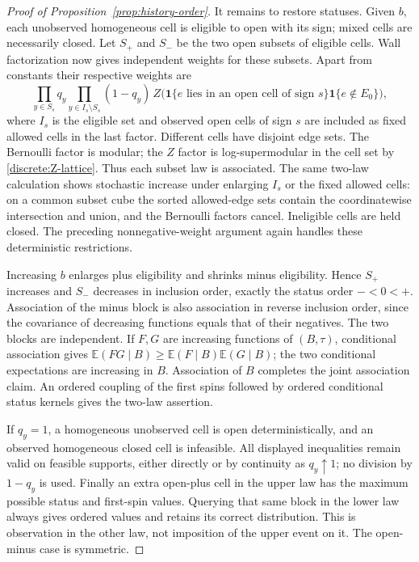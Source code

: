 \documentclass[11pt]{article}
\newcommand{\E}{\mathbb E}
\newcommand{\ind}{\mathbf 1}
\theoremstyle{definition}
\theoremstyle{remark}
\numberwithin{equation}{section}
\begin{document}
\begin{proof}[Proof of Proposition~\ref{prop:history-order}]
It remains to restore statuses. Given $b$, each unobserved homogeneous
cell is eligible to open with its sign; mixed cells are necessarily closed.
Let $S_+$ and $S_-$ be the two open subsets of eligible cells. Wall
factorization now gives independent weights for these subsets. Apart from
constants their respective weights are
\begin{equation}\label{discrete:subset-weight}
 \prod_{y\in S_s}q_y
 \prod_{y\in I_s\setminus S_s}(1-q_y)\,
 Z\bigl(\ind\{e\text{ lies in an open cell of sign }s\}
                    \ind\{e\notin E_0\}\bigr),
\end{equation}
where $I_s$ is the eligible set and observed open cells of sign $s$ are
included as fixed allowed cells in the last factor. Different cells have
disjoint edge sets. The Bernoulli factor is modular; the $Z$ factor is
log-supermodular in the cell set by \eqref{discrete:Z-lattice}. Thus each
subset law is associated. The same two-law calculation shows stochastic
increase under enlarging $I_s$ or the fixed allowed cells: on a common
subset cube the sorted allowed-edge sets contain the coordinatewise
intersection and union, and the Bernoulli factors cancel. Ineligible cells
are held closed. The preceding nonnegative-weight argument again handles
these deterministic restrictions.

Increasing $b$ enlarges plus eligibility and shrinks minus eligibility.
Hence $S_+$ increases and $S_-$ decreases in inclusion order, exactly the
status order $-<0<+$. Association of the minus block is also association
in reverse inclusion order, since the covariance of decreasing functions
equals that of their negatives. The two blocks are independent. If $F,G$
are increasing functions of $(B,\tau)$, conditional association gives
$\E(FG\mid B)\ge\E(F\mid B)\E(G\mid B)$; the two conditional
expectations are increasing in $B$. Association of $B$ completes the
joint association claim. An ordered coupling of the first spins followed
by ordered conditional status kernels gives the two-law assertion.

If $q_y=1$, a homogeneous unobserved cell is open deterministically, and
an observed homogeneous closed cell is infeasible. All displayed
inequalities remain valid on feasible supports, either directly or by
continuity as $q_y\uparrow1$; no division by $1-q_y$ is used. Finally an
extra open-plus cell in the upper law has the maximum possible status and
first-spin values. Querying that same block in the lower law always gives
ordered values and retains its correct distribution. This is observation
in the other law, not imposition of the upper event on it. The open-minus
case is symmetric.
\end{proof}
\end{document}
